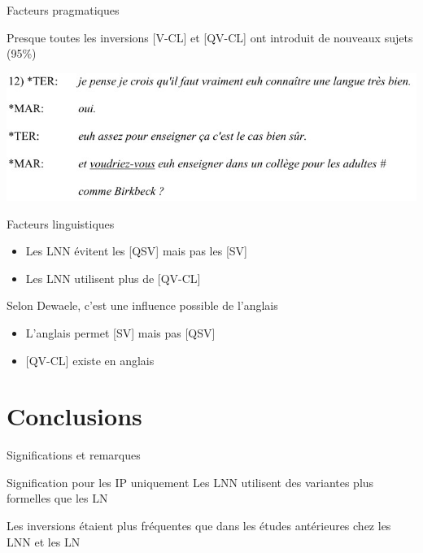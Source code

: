 \documentclass{beamer}
\begin{document}
    \begin{frame}{Facteurs pragmatiques}
      \begin{block}{}
        Presque toutes les inversions [V-CL] et [QV-CL] ont introduit de nouveaux sujets (95\%)
      \end{block}
      \includegraphics[scale=0.6]{inversion.jpg}
    \end{frame}

    \begin{frame}{Facteurs linguistiques}
      \begin{block}{}
        \begin{itemize}
          \item Les LNN évitent les [QSV] mais pas les [SV]
          \item Les LNN utilisent plus de [QV-CL]
        \end{itemize}
      \end{block}
      \begin{block}{Selon Dewaele, c'est une influence possible de l'anglais}
        \begin{itemize}
          \item L'anglais permet [SV] mais pas [QSV]
          \item {[}QV-CL] existe en anglais
        \end{itemize}
      \end{block}
    \end{frame}

  \section{Conclusions}
    \begin{frame}{Significations et remarques}
      \begin{block}{Signification pour les IP uniquement}
        Les LNN utilisent des variantes plus formelles que les LN
      \end{block}
      \begin{block}{}
        Les inversions étaient plus fréquentes que dans les études antérieures chez les LNN et les LN
      \end{block}
    \end{frame}
\end{document}
